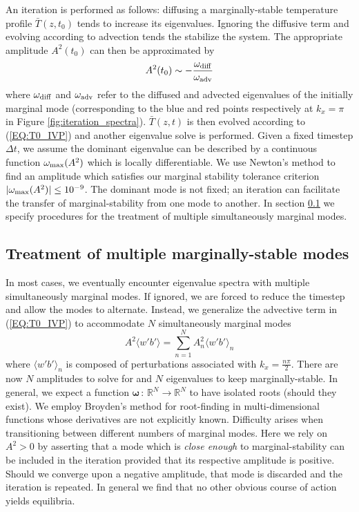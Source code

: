 \documentclass[reprint,amsmath,amssymb,aps]{revtex4-1}
\begin{document}
An iteration is performed as follows: diffusing a marginally-stable temperature profile $\bar{T}(z, t_0)$ tends to increase its eigenvalues. 
Ignoring the diffusive term and evolving according to advection tends the stabilize the system. The appropriate amplitude $A^2(t_0)$ can then be approximated by
\begin{equation}
    A^2(t_0) \sim -\frac{\omega_{\rm{diff}}}{\omega_{\rm{adv}}}
\end{equation}
where $\omega_{\rm{diff}}$ and $\omega_{\rm{adv}}$ refer to the diffused and advected eigenvalues of the initially marginal mode (corresponding to the blue and red points respectively at $k_x = \pi$ in Figure \ref{fig:iteration_spectra}). 
$\bar{T}(z, t)$ is then evolved according to (\ref{EQ:T0_IVP}) and another eigenvalue solve is performed. 
Given a fixed timestep $\Delta t$, we assume the dominant eigenvalue can be described by a continuous function $\omega_{\rm{max}} (A^2)$ which is locally differentiable. 
We use Newton's method to find an amplitude which satisfies our marginal stability tolerance criterion $|\omega_{\rm{max}} (A^2)| \leq 10^{-9}$. 
The dominant mode is not fixed; an iteration can facilitate the transfer of marginal-stability from one mode to another. 
In section \ref{sec:multiple_modes} we specify procedures for the treatment of multiple simultaneously marginal modes.

\subsection{Treatment of multiple marginally-stable modes} \label{sec:multiple_modes}
In most cases, we eventually encounter eigenvalue spectra with multiple simultaneously marginal modes. If ignored, we are forced to reduce the timestep and allow the modes to alternate. Instead, we generalize the advective term in (\ref{EQ:T0_IVP}) to accommodate $N$ simultaneously marginal modes
\begin{equation}
    A^2 \langle w' b' \rangle = \sum_{n = 1}^{N} A^2_{n} \langle w' b' \rangle_{n}
\end{equation}
where  $\langle w' b' \rangle_{n}$ is composed of perturbations associated with $k_x = \frac{n\pi}{2}$. 
There are now $N$ amplitudes to solve for and $N$ eigenvalues to keep marginally-stable. 
In general, we expect a function $\mathbf{\omega} \, : \, \mathbb{R}^N \to  \mathbb{R}^N$ to have isolated roots (should they exist). 
We employ Broyden's method for root-finding in multi-dimensional functions whose derivatives are not explicitly known. 
Difficulty arises when transitioning between different numbers of marginal modes. 
Here we rely on $A^2 > 0$ by asserting that a mode which is \textit{close enough} to marginal-stability can be included in the iteration provided that its respective amplitude is positive. 
Should we converge upon a negative amplitude, that mode is discarded and the iteration is repeated. 
In general we find that no other obvious course of action yields equilibria.
\end{document}
